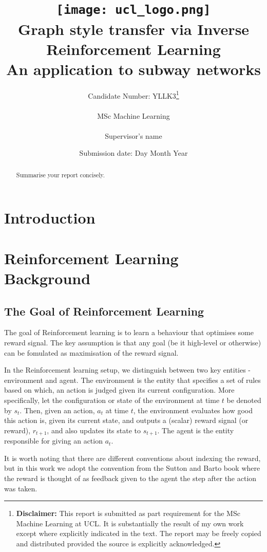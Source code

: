 \documentclass{report}
\title{
  { \texttt{[image: ucl\_logo.png]}}\\
  {{\Huge Graph style transfer via Inverse Reinforcement Learning}}\\
  {\large An application to subway networks}\\
}
\date{Submission date: Day Month Year}
\author{
  Candidate Number: YLLK3\thanks{
      {\bf Disclaimer:}
      This report is submitted as part requirement 
      for the MSc Machine Learning at UCL. It is
      substantially the result of my own work except 
      where explicitly indicated in the text.
      The report may be freely copied and 
      distributed provided the source is explicitly acknowledged.
    }
    \\ \\
  MSc Machine Learning\\ \\
  Supervisor's name
}
\numberwithin{equation}{section}
\numberwithin{figure}{section}
\numberwithin{table}{section}
\begin{document}
\onehalfspacing
\maketitle

\begin{abstract}
  Summarise your report concisely.
\end{abstract}
\tableofcontents
\setcounter{page}{1}

\chapter{Introduction}

\chapter{Reinforcement Learning Background}
\label{chap:RL}

\section{The Goal of Reinforcement Learning}
\label{sec:RLGoal}

The goal of Reinforcement learning is to learn a behaviour that 
optimises some reward signal. The key assumption is that 
any goal (be it high-level or otherwise) can be fomulated as 
maximisation of the reward signal.

In the Reinforcement learning setup, we distinguish between two 
key entities - environment and agent. The environment is the 
entity that specifies a set of rules based on which, an action 
is judged given its current configuration. 
More specifically, let the configuration or state of the 
environment at time $t$ be denoted by $s_t$. Then, 
given an action, $a_t$ at time $t$, the environment evaluates 
how good this action is, given its 
current state, and outputs a (scalar) reward signal (or reward), 
$r_{t+1}$, and also updates its state to $s_{t+1}$. The agent 
is the entity responsible for giving an action $a_t$. 

It is worth noting that there are 
different conventions about indexing the reward, but in this work 
we adopt the convention from the Sutton and Barto book 
\citep{Sutton1998} where the reward is thought of as feedback 
given to the agent the step after the action was taken.
\end{document}
